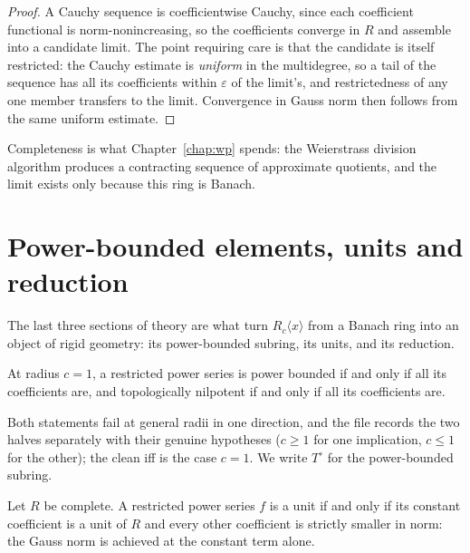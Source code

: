\begin{proof}
  \leanok
  A Cauchy sequence is coefficientwise Cauchy, since each coefficient functional is
  norm-nonincreasing, so the coefficients converge in $R$ and assemble into a candidate limit.
  The point requiring care is that the candidate is itself restricted: the Cauchy estimate is
  \emph{uniform} in the multidegree, so a tail of the sequence has all its coefficients within
  $\varepsilon$ of the limit's, and restrictedness of any one member transfers to the limit.
  Convergence in Gauss norm then follows from the same uniform estimate.
\end{proof}

Completeness is what Chapter~\ref{chap:wp} spends: the Weierstrass division algorithm produces a
contracting sequence of approximate quotients, and the limit exists only because this ring is
Banach.

\section{Power-bounded elements, units and reduction}

The last three sections of theory are what turn $R_c\langle x\rangle$ from a Banach ring into an
object of rigid geometry: its power-bounded subring, its units, and its reduction.

\begin{proposition}
  \label{prop:powerbounded}
  \leanok
  At radius $c = 1$, a restricted power series is power bounded if and only if all its
  coefficients are, and topologically nilpotent if and only if all its coefficients are.
\end{proposition}

Both statements fail at general radii in one direction, and the file records the two halves
separately with their genuine hypotheses ($c \geq 1$ for one implication, $c \leq 1$ for the
other); the clean iff is the case $c = 1$.  We write $T^\circ$ for the power-bounded subring.

\begin{theorem}
  \label{thm:restricted-units}
  \leanok
  Let $R$ be complete.  A restricted power series $f$ is a unit if and only if its constant
  coefficient is a unit of $R$ and every other coefficient is strictly smaller in norm:
  the Gauss norm is achieved at the constant term alone.
\end{theorem}

